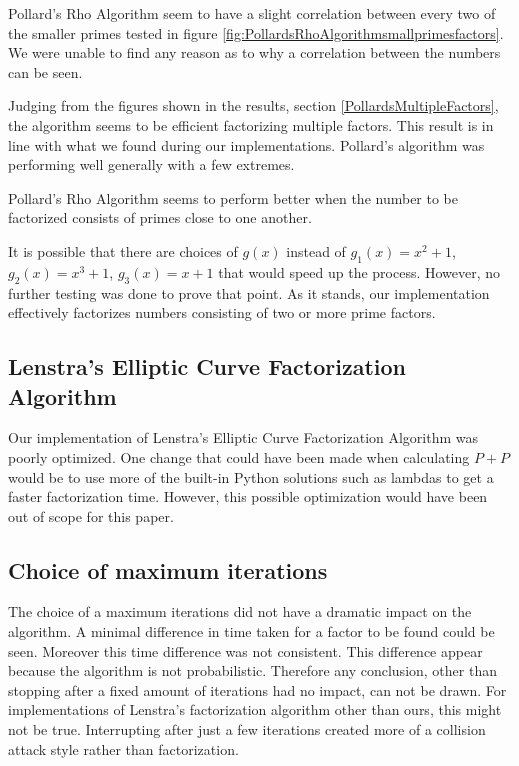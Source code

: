 Pollard's Rho Algorithm seem to have a slight correlation between every two of the smaller primes tested in figure \ref{fig:PollardsRhoAlgorithmsmallprimesfactors}. We were unable to find any reason as to why a correlation between the numbers can be seen.

Judging from the figures shown in the results, section \ref{PollardsMultipleFactors}, the algorithm seems to be efficient factorizing multiple factors. This result is in line with what we found during our implementations. Pollard's algorithm was performing well generally with a few extremes.

Pollard's Rho Algorithm seems to perform better when the number to be factorized consists of primes close to one another.

It is possible that there are choices of $g(x)$ instead of $g_1(x)=x^2+1$, $g_2(x)=x^3+1$, $g_3(x)=x+1$ that would speed up the process. However, no further testing was done to prove that point. As it stands, our implementation effectively factorizes numbers consisting of two or more prime factors.

\subsection{Lenstra's Elliptic Curve Factorization Algorithm}

Our implementation of Lenstra's Elliptic Curve Factorization Algorithm was poorly optimized. One change that could have been made when calculating $P + P$ would be to use more of the built-in Python solutions such as lambdas to get a faster factorization time. However, this possible optimization would have been out of scope for this paper.

\subsection{Choice of maximum iterations}
The choice of a maximum iterations did not have a dramatic impact on the algorithm. A minimal difference in time taken for a factor to be found could be seen. Moreover this time difference was not consistent. This difference appear because the algorithm is not probabilistic. Therefore any conclusion, other than stopping after a fixed amount of iterations had no impact, can not be drawn. For implementations of Lenstra's factorization algorithm other than ours, this might not be true. Interrupting after just a few iterations created more of a collision attack style rather than factorization.

